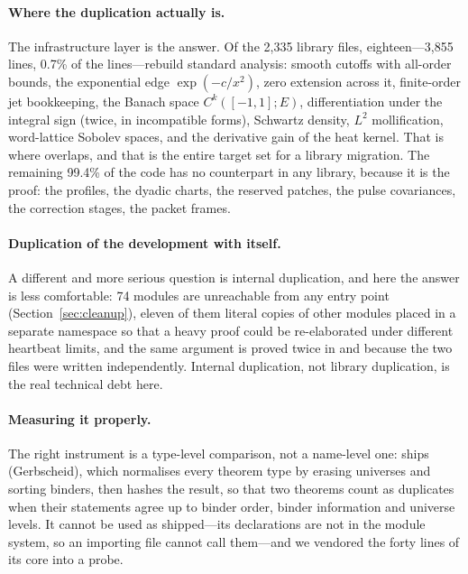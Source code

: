 \paragraph{Where the duplication actually is.} The infrastructure layer is the answer. Of
the 2{,}335 library files, eighteen---3{,}855 lines, 0.7\% of the lines---rebuild
standard analysis: smooth cutoffs with all-order bounds, the exponential edge
$\exp(-c/x^2)$, zero extension across it, finite-order jet bookkeeping, the Banach space
$C^k([-1,1];E)$, differentiation under the integral sign (twice, in incompatible forms),
Schwartz density, $L^2$ mollification, word-lattice Sobolev spaces, and the derivative gain
of the heat kernel. That is where \TauCeti{} overlaps, and that is the entire target set for
a library migration. The remaining 99.4\% of the code has no counterpart in any library,
because it is the proof: the profiles, the dyadic charts, the reserved patches, the pulse
covariances, the correction stages, the packet frames.

\paragraph{Duplication of the development with itself.} A different and more serious
question is internal duplication, and here the answer is less comfortable: 74 modules are
unreachable from any entry point (Section~\ref{sec:cleanup}), eleven of them literal copies
of other modules placed in a separate namespace so that a heavy proof could be re-elaborated
under different heartbeat limits, and the same argument is proved twice in
 and  because the two files
were written independently. Internal duplication, not library duplication, is the real
technical debt here.

\paragraph{Measuring it properly.} The right instrument is a type-level comparison, not a
name-level one: \Mathlib{} ships  (Gerbscheid),
which normalises every theorem type by erasing universes and sorting binders, then hashes
the result, so that two theorems count as duplicates when their statements agree up to
binder order, binder information and universe levels. It cannot be used as shipped---its
declarations are not  in the module system, so an importing file cannot call
them---and we vendored the forty lines of its core into a probe.

